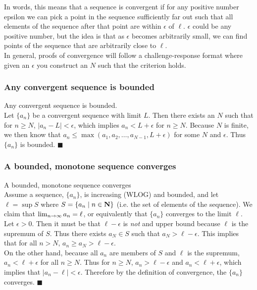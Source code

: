 \documentclass[12pt]{article}
\begin{document}
    In words, this means that a sequence is convergent if for any positive number epsilon we can pick a 
    point in the sequence sufficiently far out such that all elements of the sequence after that point 
    are within $\epsilon$ of $\ell$. $\epsilon$ could be any positive number, but the idea is that as 
    $\epsilon$ becomes arbitrarily small, we can find points of the sequence that are arbitrarily close 
    to $\ell$.\\

    In general, proofs of convergence will follow a challenge-response format where given an $\epsilon$
    you construct an $N$ such that the criterion holds.\\

  \subsubsection{Any convergent sequence is bounded}
    \thm Any convergent sequence is bounded.\\

    \pf Let $\{a_n\}$ be a convergent sequence with limit $L$. Then there exists an $N$ such that
    for $n \geq N$, $|a_n- L| < \epsilon$, which implies $a_n < L + \epsilon$ for $n \geq N$. Because
    $N$ is finite, we then know that $a_n \leq \max(a_1,a_2,\ldots,a_{N-1},L+\epsilon)$ for some
    $N$ and $\epsilon$. Thus $\{a_n\}$ is bounded. $\blacksquare$
  \subsubsection{A bounded, monotone sequence converges}
    \thm A bounded, monotone sequence converges\\

    \pf Assume a sequence, $\{a_n\}$, is increasing (WLOG) and bounded, and let $\ell = \sup S$ where 
    $S = \{a_n \mid n \in \mathbf{N}\}$ (i.e. the set of elements of the sequence). We claim that 
    $\lim_{n \to \infty} a_n = \ell$, or equivalently that $\{a_n\}$ converges to the limit $\ell$.\\

    Let $\epsilon > 0$. Then it must be that $\ell - \epsilon$ is \emph{not} and upper bound because
    $\ell$ is the supremum of $S$. Thus there exists $a_N \in S$ such that $a_N > \ell - \epsilon$. This
    implies that for all $n > N$, $a_n \geq a_N > \ell - \epsilon$.\\

    On the other hand, because all $a_n$ are members of $S$ and $\ell$ is the supremum, $a_n < \ell + \epsilon$
    for all $n \geq N$. Thus for $n \geq N$, $a_n > \ell - \epsilon$ and $a_n < \ell + \epsilon$, which implies
    that $|a_n - \ell| < \epsilon$. Therefore by the definition of convergence, the $\{a_n\}$ converges. $\blacksquare$
\end{document}
